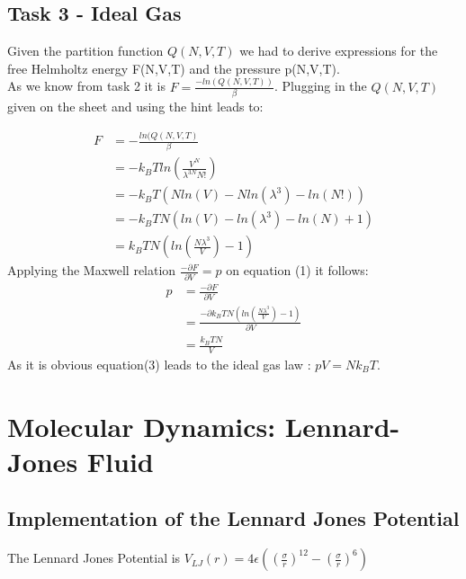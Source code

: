 \documentclass[12pt,a4paper]{scrartcl}
\begin{document}
\subsection{Task 3 - Ideal Gas}
Given the partition function $Q(N,V,T)$ we had to derive expressions for the free Helmholtz energy F(N,V,T) and the pressure p(N,V,T).\\
As we know from task 2 it is $F=\frac{-ln(Q(N,V,T))}{\beta}$.
Plugging in the $Q(N,V,T)$ given on the sheet and using the hint leads to:

 \begin{align}
 F&= -\frac{ln(Q(N,V,T)}{\beta}\nonumber\\
 &= -k_BT  ln\left(\frac{V^N}{\lambda^{3N}N!}\right)\nonumber\\
 &= -k_BT\left(N ln(V) - N ln(\lambda^{3}) - ln(N!)\right)\nonumber\\
 &= -k_BTN\left(ln(V) - ln(\lambda^{3}) -ln(N) + 1\right)\nonumber\\
 &= k_BTN\left(ln\left(\frac{N\lambda^3}{V}\right)-1\right)
 \end{align}
 Applying the Maxwell relation $\frac{-\partial F}{\partial V}=p$ on equation (1) it follows:\\
  \begin{align}
 p&=\frac{-\partial F}{\partial V} \nonumber\\
 &=\frac{-\partial k_BTN\left(ln\left(\frac{N\lambda^3}{V}\right)-1\right) }{\partial V}\nonumber\\
 &=\frac{k_BTN}{V}
 \end{align}
As it is obvious equation(3) leads to the ideal gas law : $pV=Nk_BT$.

\section{Molecular Dynamics: Lennard-Jones Fluid}
\subsection{Implementation of the Lennard Jones Potential}
The Lennard Jones Potential is $V_{LJ}(r)=4\epsilon\left(\left(\frac{\sigma}{r}\right)^{12}-\left(\frac{\sigma}{r}\right)^{6}\right) $
\end{document}
